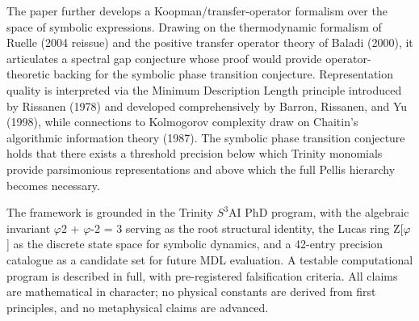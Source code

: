   The paper further develops a Koopman/transfer-operator formalism over the space of
  symbolic expressions. Drawing on the thermodynamic formalism of Ruelle (2004
  reissue) and the positive transfer operator theory of Baladi (2000), it articulates a
  spectral gap conjecture whose proof would provide operator-theoretic backing for the
  symbolic phase transition conjecture. Representation quality is interpreted via the
  Minimum Description Length principle introduced by Rissanen (1978) and developed
  comprehensively by Barron, Rissanen, and Yu (1998), while connections to Kolmogorov
  complexity draw on Chaitin's algorithmic information theory (1987). The symbolic
  phase transition conjecture holds that there exists a threshold precision below which
  Trinity monomials provide parsimonious representations and above which the full Pellis
  hierarchy becomes necessary.

  The framework is grounded in the Trinity $S^{3}$AI PhD program, with the algebraic
  invariant $\varphi$2 + $\varphi$-2 = 3 serving as the root structural identity, the Lucas ring Z[$\varphi$] as the
  discrete state space for symbolic dynamics, and a 42-entry precision catalogue as a
  candidate set for future MDL evaluation. A testable computational program is described
  in full, with pre-registered falsification criteria. All claims are mathematical in
  character; no physical constants are derived from first principles, and no metaphysical
  claims are advanced.